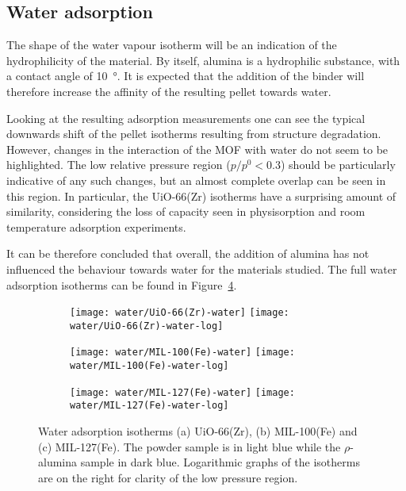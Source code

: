 
\subsection{Water adsorption}

The shape of the water vapour isotherm will be an indication of the hydrophilicity
of the material. By itself, alumina is a hydrophilic substance, with a contact 
angle of \SI{10}{\degree}. It is expected that the addition of the binder will
therefore increase the affinity of the resulting pellet towards water.

Looking at the resulting adsorption measurements one can see the typical downwards
shift of the pellet isotherms resulting from structure degradation. However, changes
in the interaction of the MOF with water do not seem to be highlighted. The low relative
pressure region (\(p/p^0 < 0.3\)) should be particularly indicative of any such 
changes, but an almost complete overlap can be seen in this region.
In particular, the UiO-66(Zr) isotherms have a surprising amount of similarity,
considering the loss of capacity seen in  physisorption and room temperature 
adsorption experiments.

It can be therefore concluded that overall, the addition of alumina has not influenced 
the behaviour towards water for the materials studied. The full water adsorption isotherms
can be found in Figure~\ref{fgr:shaping:wateradsorption}.

\begin{figure}[p!]
    \centering

    \begin{subfigure}{\linewidth}
        \centering
        \parbox{0.1\linewidth}{\caption{}\label{fgr:shaping:wateruio66}}%
        \texttt{[image: water/UiO-66(Zr)-water]}%
        \texttt{[image: water/UiO-66(Zr)-water-log]}%
    \end{subfigure}

    \begin{subfigure}{\linewidth}
        \centering
        \parbox{0.1\linewidth}{\caption{}\label{fgr:shaping:watermil100}}%
        \texttt{[image: water/MIL-100(Fe)-water]}%
        \texttt{[image: water/MIL-100(Fe)-water-log]}%
    \end{subfigure}

    \begin{subfigure}{\linewidth}
        \centering
        \parbox{0.1\linewidth}{\caption{}\label{fgr:shaping:watermil127}}%
        \texttt{[image: water/MIL-127(Fe)-water]}%
        \texttt{[image: water/MIL-127(Fe)-water-log]}%
    \end{subfigure}
    
    \caption{Water adsorption isotherms (a) UiO-66(Zr), 
    (b) MIL-100(Fe) and (c) MIL-127(Fe). The powder sample is in light
    blue while the \(\rho\)-alumina sample in dark blue. Logarithmic
    graphs of the isotherms are on the right for clarity of the low
    pressure region.}%
    \label{fgr:shaping:wateradsorption}
\end{figure}